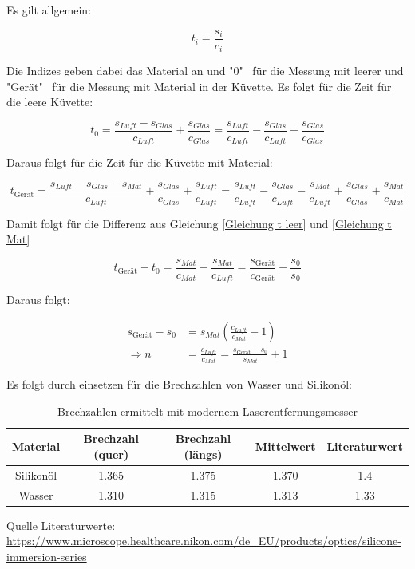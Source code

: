 Es gilt allgemein:

\begin{equation}
    t_i = \frac{s_i}{c_i} 
\end{equation}

Die Indizes geben dabei das Material an und "0" \, für die Messung mit leerer und "Gerät" \, für die Messung mit Material in der Küvette. Es folgt für die Zeit für die leere Küvette:

\begin{equation} \label{Gleichung t leer}
    t_{0} = \frac{s_{Luft} - s_{Glas}}{c_{Luft}} + \frac{s_{Glas}}{c_{Glas}} = \frac{s_{Luft}}{c_{Luft}} - \frac{s_{Glas}}{c_{Luft}} + \frac{s_{Glas}}{c_{Glas}}
\end{equation}

Daraus folgt für die Zeit für die Küvette mit Material: 

\begin{equation} \label{Gleichung t Mat}
    t_{\text{Gerät}} = \frac{s_{Luft} -s_{Glas} -s_{Mat}}{c_{Luft}} + \frac{s_{Glas}}{c_{Glas}} + \frac{s_{Luft}}{c_{Luft}} = \frac{s_{Luft}}{c_{Luft}} - \frac{s_{Glas}}{c_{Luft}} - \frac{s_{Mat}}{c_{Luft}} + \frac{s_{Glas}}{c_{Glas}} + \frac{s_{Mat}}{c_{Mat}}
\end{equation}

Damit folgt für die Differenz aus Gleichung \ref{Gleichung t leer} und \ref{Gleichung t Mat}

\begin{equation}
    t_{\text{Gerät}} - t_{0} = \frac{s_{Mat}}{c_{Mat}} - \frac{s_{Mat}}{c_{Luft}} = \frac{s_{\text{Gerät}}}{c_{\text{Gerät}}} - \frac{s_0}{s_0}
\end{equation}

Daraus folgt:

\begin{align}
    s_{\text{Gerät}} - s_0 &= s_{Mat} (\frac{c_{Luft}}{c_{Mat}} - 1) \\
    \Rightarrow n &= \frac{c_{Luft}}{c_{Mat}} = \frac{s_{\text{Gerät}} - s_0}{s_{Mat}} + 1
\end{align}

Es folgt durch einsetzen für die Brechzahlen von Wasser und Silikonöl:

\begin{table}[h]
    \caption{Brechzahlen ermittelt mit modernem Laserentfernungsmesser}
    \label{tab:Brechzahlen Laser}
    \centering
    \begin{tabular}{c c c c c}
    \hline
    Material & Brechzahl (quer) & Brechzahl (längs) & Mittelwert & Literaturwert\\
    \hline
    Silikonöl & 1.365 & 1.375 & 1.370 & 1.4 \\
    Wasser & 1.310 & 1.315 & 1.313 & 1.33 \\
    \hline
    \end{tabular}
    Quelle Literaturwerte: \url{https://www.microscope.healthcare.nikon.com/de_EU/products/optics/silicone-immersion-series}
\end{table}

